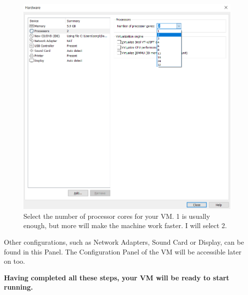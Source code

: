 \documentclass[a4paper]{article}
\newcommand\tab[1][1cm]{\hspace*{#1}}
\begin{document}
    \clearpage
    \begin{figure} [h]
        \centering
        \includegraphics[width=\textwidth, keepaspectratio]{Images/Create_VM/Creating_VM_7.png}
        \caption{Select the number of processor cores for your VM. 1 is usually enough, but more
        will make the machine work faster. I will select 2.}
    \end{figure}

    \vspace{0.5cm}

    \tab Other configurations, such as Network Adapters, Sound Card or Display, can be found in this Panel.
    The Configuration Panel of the VM will be accessible later on too. 

    \vfill

    \begin{tcolorbox}[colback=green!5!white,colframe=green!75!black]
        \centering
        \textbf{Having completed all these steps, your VM will be ready to start running.}
    \end{tcolorbox}

    \vfill
    \clearpage
\end{document}
